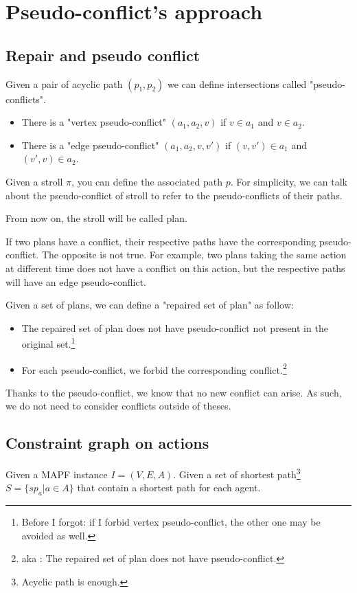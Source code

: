 \section{Pseudo-conflict's approach}\label{sec:approach}

\subsection{Repair and pseudo conflict}
Given a pair of acyclic path $(p_1,p_2)$ we can define intersections called "pseudo-conflicts".

\begin{itemize}
  \item There is a "vertex pseudo-conflict" $(a_1,a_2,v)$ if $v \in a_1$ and $v \in a_2$.
  \item There is a "edge pseudo-conflict" $(a_1,a_2,v,v')$ if $(v,v') \in a_1$ and $(v',v) \in a_2$.
\end{itemize}

Given a stroll $\pi$, you can define the associated path $p$. For simplicity, we can talk about the pseudo-conflict of stroll to refer to the pseudo-conflicts of their paths.

From now on, the stroll will be called plan.

If two plans have a conflict, their respective paths have the corresponding pseudo-conflict. The opposite is not true. For example, two plans taking the same action at different time does not have a conflict on this action, but the respective paths will have an edge pseudo-conflict.

Given a set of plans, we can define a "repaired set of plan" as follow:
\begin{itemize}
  \item The repaired set of plan does not have pseudo-conflict not present in the original set.\footnote{Before I forgot: if I forbid vertex pseudo-conflict, the other one may be avoided as well.}
  \item For each pseudo-conflict, we forbid the corresponding conflict.\footnote{aka : The repaired set of plan does not have pseudo-conflict.}
\end{itemize}
Thanks to the pseudo-conflict, we know that no new conflict can arise. As such, we do not need to consider conflicts outside of theses.

\subsection{Constraint graph on actions}
Given a MAPF instance $I=(V,E,A)$.
Given a set of shortest path\footnote{Acyclic path is enough.} $S = \{sp_a | a \in A \}$ that contain a shortest path for each agent.

